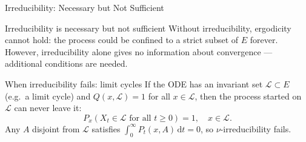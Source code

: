 \documentclass[aspectratio=169]{beamer}
\begin{document}
\begin{frame}{Irreducibility: Necessary but Not Sufficient}

  \begin{alertblock}{Irreducibility is necessary but not sufficient}
    Without irreducibility, ergodicity cannot hold: the process could
    be confined to a strict subset of $E$ forever. However,
    irreducibility alone gives no information about convergence ---
    additional conditions are needed.
  \end{alertblock}

  \bigskip
  \begin{alertblock}{When irreducibility fails: limit cycles}
    If the ODE has an invariant set $\mathcal{L} \subset E$
    (e.g.\ a limit cycle) and $Q(x, \mathcal{L}) = 1$ for all
    $x \in \mathcal{L}$, then the process started on $\mathcal{L}$
    can never leave it:
    \[
      P_x(X_t \in \mathcal{L} \text{ for all } t \geq 0) = 1,
      \quad x \in \mathcal{L}.
    \]
    Any $A$ disjoint from $\mathcal{L}$ satisfies
    $\int_0^\infty P_t(x,A)\,\mathrm{d}t = 0$, so
    $\nu$-irreducibility fails.
  \end{alertblock}


\end{frame}
\end{document}

